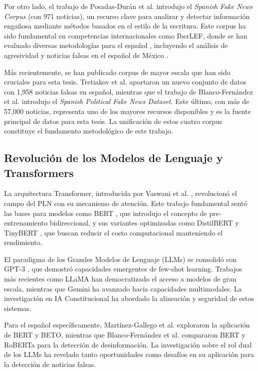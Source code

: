 Por otro lado, el trabajo de Posadas-Durán et al. \cite{posadas2019detection} introdujo el \textit{Spanish Fake News Corpus} (con 971 noticias), un recurso clave para analizar y detectar información engañosa mediante métodos basados en el estilo de la escritura. Este corpus ha sido fundamental en competencias internacionales como IberLEF, donde se han evaluado diversas metodologías para el español \cite{gomez2021overview}, incluyendo el análisis de agresividad y noticias falsas en el español de México \cite{aragon2020overview}.

Más recientemente, se han publicado corpus de mayor escala que han sido cruciales para esta tesis. Tretiakov et al. \cite{tretiakov2022detection} aportaron un nuevo conjunto de datos con 1,958 noticias falsas en español, mientras que el trabajo de Blanco-Fernández et al. \cite{blanco2024enhancing} introdujo el \textit{Spanish Political Fake News Dataset}. Este último, con más de 57,000 noticias, representa uno de los mayores recursos disponibles y es la fuente principal de datos para esta tesis. La unificación de estos cuatro corpus constituye el fundamento metodológico de este trabajo.

\subsection{Revolución de los Modelos de Lenguaje y Transformers}
La arquitectura Transformer, introducida por Vaswani et al. \cite{vaswani2017attention}, revolucionó el campo del PLN con su mecanismo de atención. Este trabajo fundamental sentó las bases para modelos como BERT \cite{devlin2018bert}, que introdujo el concepto de pre-entrenamiento bidireccional, y sus variantes optimizadas como DistilBERT \cite{sanh2019distilbert} y TinyBERT \cite{jiao2019tinybert}, que buscan reducir el costo computacional manteniendo el rendimiento.

El paradigma de los Grandes Modelos de Lenguaje (LLMs) se consolidó con GPT-3 \cite{brown2020language}, que demostró capacidades emergentes de few-shot learning. Trabajos más recientes como LLaMA \cite{touvron2023llama} han democratizado el acceso a modelos de gran escala, mientras que Gemini \cite{gemini2023family} ha avanzado hacia capacidades multimodales. La investigación en IA Constitucional \cite{bai2022constitutional} ha abordado la alineación y seguridad de estos sistemas.

Para el español específicamente, Martínez-Gallego et al. \cite{martinez2021fake} exploraron la aplicación de BERT y BETO, mientras que Blanco-Fernández et al. \cite{blanco2024enhancing} compararon BERT y RoBERTa para la detección de desinformación. La investigación sobre el rol dual de los LLMs \cite{hu2024bad, su2023adapting, su2023fake} ha revelado tanto oportunidades como desafíos en su aplicación para la detección de noticias falsas.

